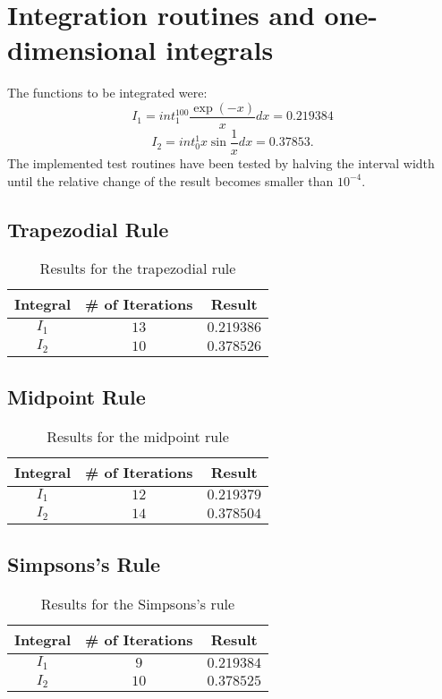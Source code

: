 \section{ Integration routines and one-dimensional integrals}
The functions to be integrated were:
\begin{equation}
I_1 = int_{1}^{100} \frac{\exp(-x)}{x} dx =  0.219384
\end{equation}
\begin{equation}
I_2 = int_{0}^{1} x \sin{\frac{1}{x}} dx = 0.37853 .
\end{equation}
The implemented test routines have been tested by halving the interval width until the relative change of the result becomes smaller than $10^{-4}$.
\subsection{Trapezodial Rule}
\begin{table}[h]
    \centering
    \caption{Results for the trapezodial rule}
    \label{tab:freq}
    \begin{tabular}{ccc}
        \toprule
        Integral & \# of Iterations & Result\\
        \midrule
        $I_1$ & $13$ &  $0.219386$ \\
        $I_2$ & $10$ &  $0.378526$ \\
        \bottomrule
    \end{tabular}
\end{table}

\subsection{Midpoint Rule}
\begin{table}[h]
    \centering
    \caption{Results for the midpoint rule}
    \label{tab:freq}
    \begin{tabular}{ccc}
        \toprule
        Integral & \# of Iterations & Result\\
        \midrule
        $I_1$ & $12$ &  $0.219379$ \\
        $I_2$ & $14$ &  $0.378504$ \\
        \bottomrule
    \end{tabular}
\end{table}

\subsection{Simpsons's Rule}
\begin{table}[h]
    \centering
    \caption{Results for the Simpsons's rule}
    \label{tab:freq}
    \begin{tabular}{ccc}
        \toprule
        Integral & \# of Iterations & Result\\
        \midrule
        $I_1$ & $9$ &  $0.219384$\\
        $I_2$ & $10$ &  $0.378525$ \\
        \bottomrule
    \end{tabular}
\end{table}